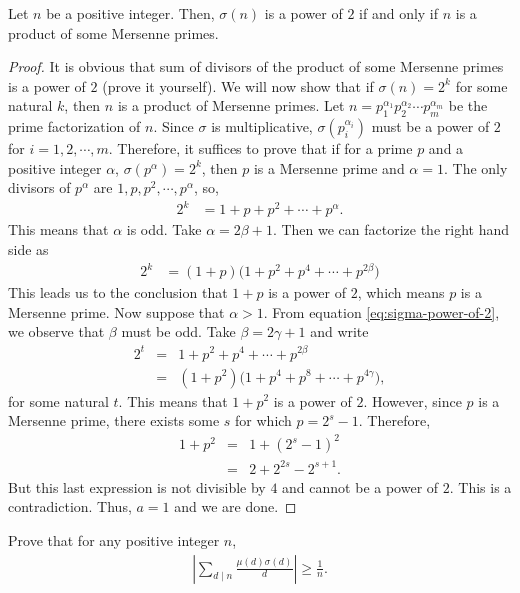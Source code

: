 \documentclass[12pt]{subfile}
\begin{document}
	\begin{theorem}
		Let $n$ be a positive integer. Then, $\sigma(n)$ is a power of $2$ if and only if $n$ is a product of some Mersenne primes.
	\end{theorem}

	\begin{proof}
		It is obvious that sum of divisors of the product of some Mersenne primes is a power of $2$ (prove it yourself). We will now show that if $\sigma(n)=2^k$ for some natural $k$, then $n$ is a product of Mersenne primes. Let $n = p_1^{\alpha_1}p_2^{\alpha_2} \cdots p_m^{\alpha_m}$ be the prime factorization of $n$. Since $\sigma$ is multiplicative,  $\sigma(p_i^{\alpha_i})$ must be a power of $2$ for $i=1,2,\cdots,m$. Therefore, it suffices to prove that if for a prime $p$ and a positive integer $\alpha$, $\sigma(p^\alpha) = 2^k$, then $p$ is a Mersenne prime and $\alpha = 1$. The only divisors of $p^\alpha$ are $1,p,p^2,\cdots,p^\alpha$, so,
			\begin{align*}
				2^k &= 1 + p + p^2 + \cdots + p^\alpha.
			\end{align*}
		This means that $\alpha$ is odd. Take $\alpha= 2\beta+ 1$. Then we can factorize the right hand side as
			\begin{align}
				2^k &= (1+p)\Big(1 + p^2 + p^4 + \cdots + p^{2\beta}\Big) \label{eq:sigma-power-of-2}
			\end{align}
		This leads us to the conclusion that $1+p$ is a power of $2$, which means $p$ is a Mersenne prime. Now suppose that $\alpha > 1$. From equation \ref{eq:sigma-power-of-2}, we observe that $\beta$ must be odd. Take $\beta = 2 \gamma + 1$ and write
			\begin{eqnarray*}
				2^t &=& 1 + p^2 + p^4 + \cdots + p^{2\beta}\\
					&=& \left(1+p^2\right)\Big(1+p^4 + p^8 + \cdots + p^{4 \gamma}\Big),
			\end{eqnarray*}
		for some natural $t$. This means that $1+p^2$ is a power of $2$. However, since $p$ is a Mersenne prime, there exists some $s$ for which $p=2^s - 1$. Therefore,
			\begin{eqnarray*}
				1+p^2 &=& 1 + (2^s -1)^2\\
					  &=& 2 + 2^{2s} - 2^{s+1}.
			\end{eqnarray*}
		But this last expression is not divisible by $4$ and cannot be a power of $2$. This is a contradiction. Thus, $a=1$ and we are done.
	\end{proof}


	\begin{problem}
		Prove that for any positive integer $n$,
			\begin{align*}
				\left|\sum_{d\mid n}\frac{\mu(d)\sigma(d)}{d}\right| \geq \frac{1}{n}.
			\end{align*}
	\end{problem}
\end{document}
